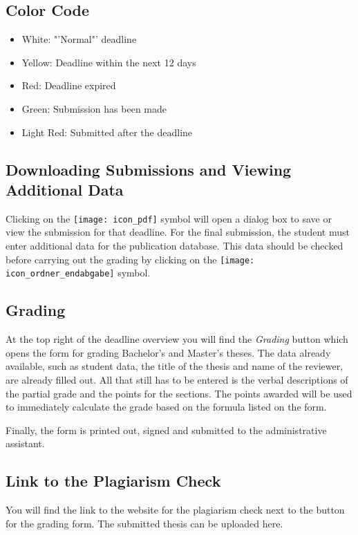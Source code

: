 \subsection{Color Code}

\begin{itemize}
	\item White:	"'Normal"' deadline
	\item Yellow:	Deadline within the next 12 days
	\item Red:	Deadline expired
	\item Green:	Submission has been made
	\item Light Red: Submitted after the deadline 
\end{itemize}

\subsection{Downloading Submissions and Viewing Additional Data}
Clicking on the \texttt{[image: icon\_pdf]} symbol will open a dialog box to save or view the submission for that deadline.
For the final submission, the student must enter additional data for the publication database. This data should be checked before carrying out the grading by clicking on the \texttt{[image: icon\_ordner\_endabgabe]} symbol.

\subsection{Grading}
At the top right of the deadline overview you will find the \textit{Grading} button which opens the form for grading Bachelor's and Master's theses. The data already available, such as student data, the title of the thesis and name of the reviewer, are already filled out. All that still has to be entered is the verbal descriptions of the partial grade and the points for the sections. The points awarded will be used to immediately calculate the grade based on the formula listed on the form. 

Finally, the form is printed out, signed and submitted to the administrative assistant.

\subsection{Link to the Plagiarism Check}
You will find the link to the website for the plagiarism check next to the button for the grading form. The submitted thesis can be uploaded here.

